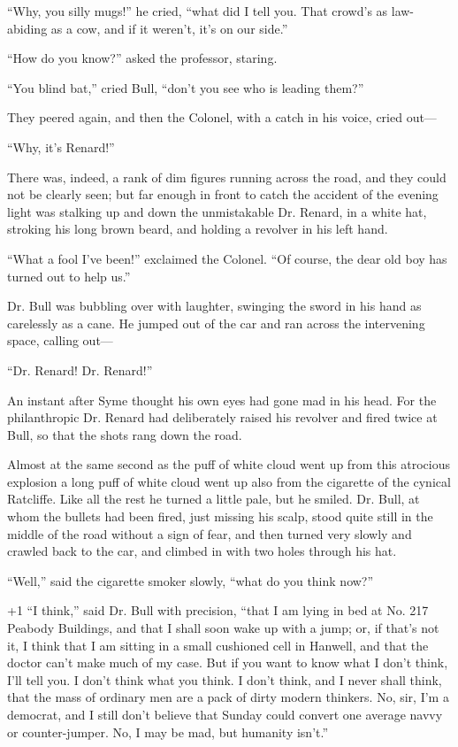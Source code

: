 “Why, you silly mugs!” he cried, “what did I tell you. That crowd’s as law-abiding as a cow, and if it weren’t, it’s on our side.”

“How do you know?” asked the professor, staring.

“You blind bat,” cried Bull, “don’t you see who is leading them?”

They peered again, and then the Colonel, with a catch in his voice, cried out⁠—

“Why, it’s Renard!”

There was, indeed, a rank of dim figures running across the road, and they could not be clearly seen; but far enough in front to catch the accident of the evening light was stalking up and down the unmistakable Dr. Renard, in a white hat, stroking his long brown beard, and holding a revolver in his left hand.

“What a fool I’ve been!” exclaimed the Colonel. “Of course, the dear old boy has turned out to help us.”

Dr. Bull was bubbling over with laughter, swinging the sword in his hand as carelessly as a cane. He jumped out of the car and ran across the intervening space, calling out⁠—

“Dr. Renard! Dr. Renard!”

An instant after Syme thought his own eyes had gone mad in his head. For the philanthropic Dr. Renard had deliberately raised his revolver and fired twice at Bull, so that the shots rang down the road.

Almost at the same second as the puff of white cloud went up from this atrocious explosion a long puff of white cloud went up also from the cigarette of the cynical Ratcliffe. Like all the rest he turned a little pale, but he smiled. Dr. Bull, at whom the bullets had been fired, just missing his scalp, stood quite still in the middle of the road without a sign of fear, and then turned very slowly and crawled back to the car, and climbed in with two holes through his hat.

“Well,” said the cigarette smoker slowly, “what do you think now?”

\looseness+1
“I think,” said Dr. Bull with precision, “that I am lying in bed at No. 217 Peabody Buildings, and that I shall soon wake up with a jump; or, if that’s not it, I think that I am sitting in a small cushioned cell in Hanwell, and that the doctor can’t make much of my case. But if you want to know what I don’t think, I’ll tell you. I don’t think what you think. I don’t think, and I never shall think, that the mass of ordinary men are a pack of dirty modern thinkers. No, sir, I’m a democrat, and I still don’t believe that Sunday could convert one average navvy or counter-jumper. No, I may be mad, but humanity isn’t.”

